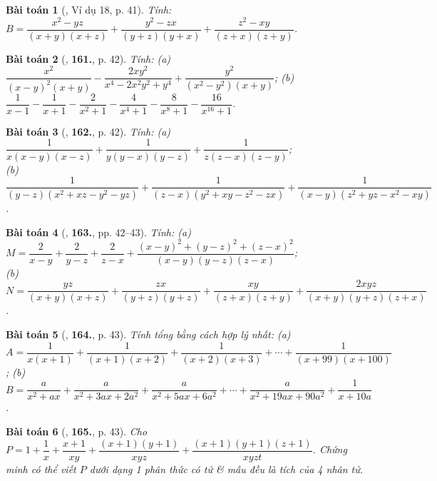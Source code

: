 \documentclass{article}
\numberwithin{equation}{section}
\newtheorem{baitoan}{Bài toán}
\begin{document}
\begin{baitoan}[\cite{Tuyen_Toan_8}, Ví dụ 18, p. 41]
	Tính: $B = \dfrac{x^2 - yz}{(x + y)(x + z)} + \dfrac{y^2 - zx}{(y + z)(y + x)} + \dfrac{z^2 - xy}{(z + x)(z + y)}$.
\end{baitoan}

\begin{baitoan}[\cite{Tuyen_Toan_8}, \textbf{161.}, p. 42]
	Tính: (a) $\dfrac{x^2}{(x - y)^2(x + y)} - \dfrac{2xy^2}{x^4 - 2x^2y^2 + y^4} + \dfrac{y^2}{(x^2 - y^2)(x + y)}$; (b) $\dfrac{1}{x - 1} - \dfrac{1}{x + 1} - \dfrac{2}{x^2 + 1} - \dfrac{4}{x^4 + 1} - \dfrac{8}{x^8 + 1} - \dfrac{16}{x^{16} + 1}$.
\end{baitoan}

\begin{baitoan}[\cite{Tuyen_Toan_8}, \textbf{162.}, p. 42]
	Tính: (a) $\dfrac{1}{x(x - y)(x - z)} + \dfrac{1}{y(y - x)(y - z)} + \dfrac{1}{z(z - x)(z - y)}$;\\(b) $\dfrac{1}{(y - z)(x^2 + xz - y^2 - yz)} + \dfrac{1}{(z - x)(y^2 + xy - z^2 - zx)} + \dfrac{1}{(x - y)(z^2 + yz - x^2 - xy)}$.
\end{baitoan}

\begin{baitoan}[\cite{Tuyen_Toan_8}, \textbf{163.}, pp. 42--43]
	Tính: (a) $M = \dfrac{2}{x - y} + \dfrac{2}{y - z} + \dfrac{2}{z - x} + \dfrac{(x - y)^2 + (y - z)^2 + (z - x)^2}{(x - y)(y - z)(z - x)}$;\\(b) $N = \dfrac{yz}{(x + y)(x + z)} + \dfrac{zx}{(y + z)(y + z)} + \dfrac{xy}{(z + x)(z + y)} + \dfrac{2xyz}{(x + y)(y + z)(z + x)}$.
\end{baitoan}

\begin{baitoan}[\cite{Tuyen_Toan_8}, \textbf{164.}, p. 43]
	Tính tổng bằng cách hợp lý nhất: (a) $A = \dfrac{1}{x(x + 1)} + \dfrac{1}{(x + 1)(x + 2)} + \dfrac{1}{(x + 2)(x + 3)} + \cdots + \dfrac{1}{(x + 99)(x + 100)}$; (b) $B = \dfrac{a}{x^2 + ax} + \dfrac{a}{x^2 + 3ax + 2a^2} + \dfrac{a}{x^2 + 5ax + 6a^2} + \cdots + \dfrac{a}{x^2 + 19ax + 90a^2} + \dfrac{1}{x + 10a}$.
\end{baitoan}

\begin{baitoan}[\cite{Tuyen_Toan_8}, \textbf{165.}, p. 43]
	Cho $P = 1 + \dfrac{1}{x} + \dfrac{x + 1}{xy} + \dfrac{(x + 1)(y + 1)}{xyz} + \dfrac{(x + 1)(y + 1)(z + 1)}{xyzt}$. Chứng minh có thể viết $P$ dưới dạng 1 phân thức có tử \& mẫu đều là tích của 4 nhân tử.
\end{baitoan}
\end{document}
